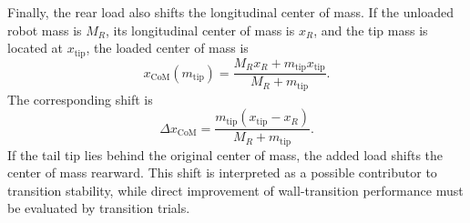 Finally, the rear load also shifts the longitudinal center of mass. If the unloaded robot mass is $M_R$, its longitudinal center of mass is $x_R$, and the tip mass is located at $x_{\mathrm{tip}}$, the loaded center of mass is
\begin{equation}
  x_{\mathrm{CoM}}(m_{\mathrm{tip}})=
  \frac{M_Rx_R+m_{\mathrm{tip}}x_{\mathrm{tip}}}
  {M_R+m_{\mathrm{tip}}}.
  \label{eqn:center_of_mass_loaded}
\end{equation}
The corresponding shift is
\begin{equation}
  \Delta x_{\mathrm{CoM}} =
  \frac{m_{\mathrm{tip}}(x_{\mathrm{tip}}-x_R)}
  {M_R+m_{\mathrm{tip}}}.
  \label{eqn:center_of_mass_shift}
\end{equation}
If the tail tip lies behind the original center of mass, the added load shifts the center of mass rearward. This shift is interpreted as a possible contributor to transition stability, while direct improvement of wall-transition performance must be evaluated by transition trials.

